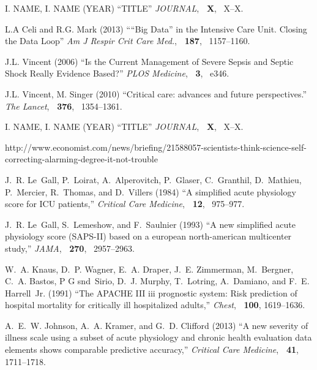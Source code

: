 \documentclass{bioinfo}
\begin{document}
\begin{thebibliography}{}

I. NAME, I. NAME (YEAR) ``TITLE''
  {\em JOURNAL}, {\bf ~X}, ~X--X.

L.A Celi and R.G. Mark (2013) ``“Big Data” in the Intensive Care Unit. Closing the Data Loop''
  {\em Am J Respir Crit Care Med.}, {\bf ~187}, ~1157--1160.
  
J.L. Vincent (2006) ``Is the Current Management of Severe Sepsis and Septic Shock Really Evidence Based?''
  {\em PLOS Medicine}, {\bf ~3}, ~e346.

J.L. Vincent, M. Singer (2010) ``Critical care: advances and future perspectives.''
  {\em The Lancet}, {\bf ~376}, ~1354--1361.
  
I. NAME, I. NAME (YEAR) ``TITLE''
  {\em JOURNAL}, {\bf ~X}, ~X--X.

http://www.economist.com/news/briefing/21588057-scientists-think-science-self-correcting-alarming-degree-it-not-trouble

J.~R. Le~Gall, P.~Loirat, A.~Alperovitch, P.~Glaser, C.~Granthil, D.~Mathieu,
  P.~Mercier, R.~Thomas, and D.~Villers (1984) ``A simplified acute physiology score
  for {ICU} patients,'' {\it Critical Care Medicine}, {\bf ~12}, ~975--977.

J.~R. Le~Gall, S.~Lemeshow, and F.~Saulnier (1993) ``A new simplified acute physiology
  score ({SAPS-II}) based on a european north-american multicenter study,''
  {\em JAMA}, {\bf ~270}, ~2957--2963.
 
W.~A. Knaus, D.~P. Wagner, E.~A. Draper, J.~E. Zimmerman, M.~Bergner, C.~A.
  Bastos, P G snd~Sirio, D.~J. Murphy, T.~Lotring, A.~Damiano, and F.~E.
  Harrell~Jr. (1991) ``The {APACHE III} iii prognostic system: Risk prediction of
  hospital mortality for critically ill hospitalized adults,'' {\em Chest},
  {\bf ~100}, 1619--1636.
 
A.~E.~W. Johnson, A.~A. Kramer, and G.~D. Clifford (2013) ``A new severity of illness
  scale using a subset of acute physiology and chronic health evaluation data
  elements shows comparable predictive accuracy,'' {\em Critical Care
  Medicine}, {\bf ~41}, 1711--1718.
  

\end{thebibliography}
\end{document}
